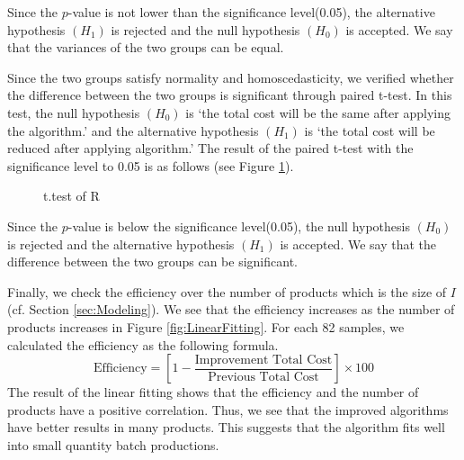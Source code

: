 \documentclass[a4paper]{amsart}
\numberwithin{equation}{section} %
\numberwithin{figure}{section} %
\numberwithin{table}{section}
\theoremstyle{plain}
\theoremstyle{definition}
\theoremstyle{plain}
\theoremstyle{plain}
\theoremstyle{plain}
\theoremstyle{plain}
\theoremstyle{plain}
\begin{document}
Since the $p$-value is not lower than the significance level(0.05), the alternative hypothesis $(H_{1})$ is rejected and the null hypothesis $(H_{0})$ is accepted. 
We say that the variances of the two groups can be equal.

Since the two groups satisfy normality and homoscedasticity, we verified whether the difference between the two groups is significant through paired t-test. In this test, the null hypothesis $(H_{0})$ is `the total cost will be the same after applying the algorithm.' and the alternative hypothesis $(H_{1})$ is `the total cost will be reduced after applying algorithm.' The result of the paired t-test with the significance level to 0.05 is as follows (see Figure \ref{fig:ttest}).

\begin{figure}[h!]
	\centering
	\caption{t.test of R}
	\label{fig:ttest}       %
\end{figure}

Since the $p$-value is below the significance level(0.05), the null hypothesis $(H_{0})$ is rejected and the alternative hypothesis $(H_{1})$ is accepted. We say that the difference between the two groups can be significant.

Finally, we check the efficiency over the number of products which is the size of $I$(cf. Section \ref{sec:Modeling}).
We see that the efficiency increases as the number of products increases in Figure \ref{fig:LinearFitting}.
For each 82 samples, we calculated the efficiency as the following formula.
\begin{equation}
	\textrm{Efficiency} = \left[1-\frac{\textrm{Improvement~Total~Cost}}{\textrm{Previous~Total~Cost}}\right]\times 100
\end{equation}
The result of the linear fitting shows that the efficiency and the number of products have a positive correlation.
Thus, we see that the improved algorithms have better results in many products.
This suggests that the algorithm fits well into small quantity batch productions.
\end{document}
